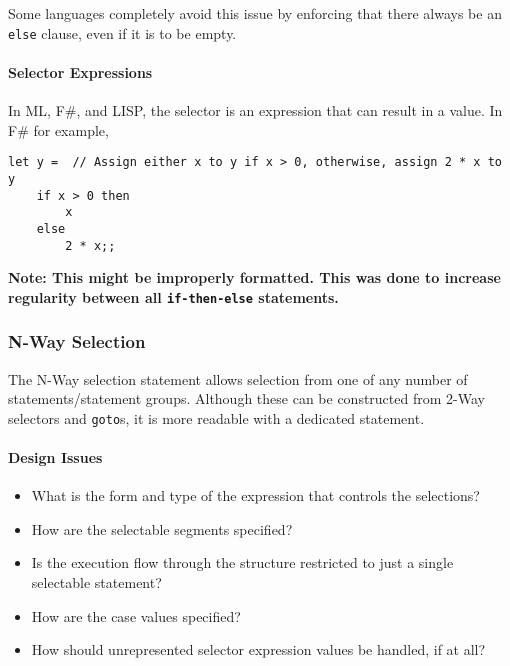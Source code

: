 \begin{remark*}
  Some languages completely avoid this issue by enforcing that there always be an \texttt{else} clause, even if it is to be empty.
\end{remark*}

\paragraph{Selector Expressions}\label{par:2_Way_Selection-Selector_Expressions}
In ML, F\#, and LISP, the selector is an expression that can result in a value.
In F\# for example,
\begin{verbatim}
let y =  // Assign either x to y if x > 0, otherwise, assign 2 * x to y
    if x > 0 then
        x
    else
        2 * x;;
\end{verbatim}
\textbf{Note: This might be improperly formatted. This was done to increase regularity between all \texttt{if-then-else} statements.}

\subsubsection{N-Way Selection}\label{subsubsec:N_Way_Selection}
The N-Way selection statement allows selection from one of any number of statements/statement groups.
Although these can be constructed from 2-Way selectors and \texttt{goto}s, it is more readable with a dedicated statement.

\paragraph{Design Issues}\label{par:N_Way_Selection-Design_Issues}
\begin{itemize}[noitemsep]
\item What is the form and type of the expression that controls the selections?
\item How are the selectable segments specified?
\item Is the execution flow through the structure restricted to just a single selectable statement?
\item How are the case values specified?
\item How should unrepresented selector expression values be handled, if at all?
\end{itemize}

